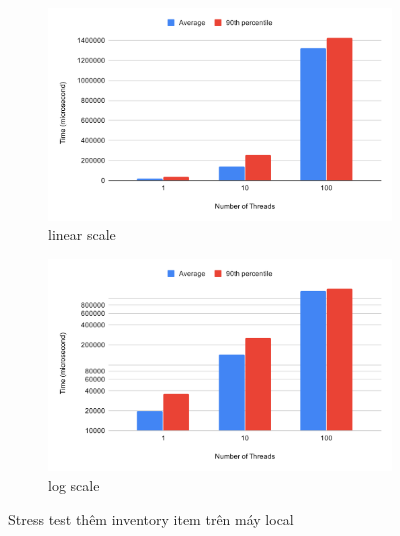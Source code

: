 \begin{figure}[H]
\centering
\begin{subfigure}{0.5\textwidth}
    \centering
    \includegraphics[width=\textwidth]
    {images/testing/stress-add-inventory-item.png}
    \caption{linear scale}
\end{subfigure}%
\begin{subfigure}{0.5\textwidth}
    \centering
    \includegraphics[width=\textwidth]
    {images/testing/stress-add-inventory-item-log.png}
    \caption{log scale}
\end{subfigure}
\caption{Stress test thêm inventory item trên máy local}
\end{figure}

